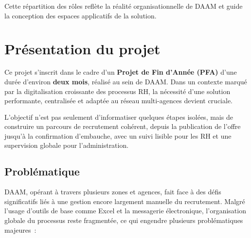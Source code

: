 Cette répartition des rôles reflète la réalité organisationnelle de DAAM et
guide la conception des espaces applicatifs de la solution.


\section{Présentation du projet}

Ce projet s'inscrit dans le cadre d'un \textbf{Projet de Fin d'Année (PFA)}
d'une durée d'environ \textbf{deux mois}, réalisé au sein de DAAM. Dans un
contexte marqué par la digitalisation croissante des processus RH, la nécessité
d'une solution performante, centralisée et adaptée au réseau multi-agences
devient cruciale.

L'objectif n'est pas seulement d'informatiser quelques étapes isolées, mais de
construire un parcours de recrutement cohérent, depuis la publication de
l'offre jusqu'à la confirmation d'embauche, avec un suivi lisible pour les RH
et une supervision globale pour l'administration.


\subsection{Problématique}

DAAM, opérant à travers plusieurs zones et agences, fait face à des défis
significatifs liés à une gestion encore largement manuelle du recrutement.
Malgré l'usage d'outils de base comme Excel et la messagerie électronique,
l'organisation globale du processus reste fragmentée, ce qui engendre plusieurs
problématiques majeures~:

